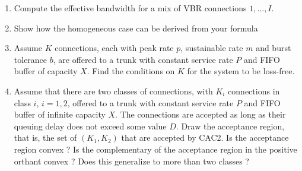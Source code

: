\begin{problem}
\begin{enumerate}
    \item Compute the effective bandwidth for a mix of VBR
    connections $1, \ldots, I$.

    \item Show how the homogeneous case can be derived from your formula

    \item Assume $K$ connections, each with peak rate $p$, sustainable rate
    $m$ and burst tolerance $b$, are offered to a trunk with constant
    service rate $P$ and FIFO buffer of capacity $X$. Find the
    conditions on $K$ for the system to be loss-free.

    \item  Assume that there are two classes of connections, with
    $K_{i}$ connections in class $i$, $i=1,2$, offered to a trunk with constant
    service rate $P$ and FIFO buffer of infinite capacity $X$. The
    connections are accepted as long as their queuing delay does
    not exceed some value $D$.
    Draw the acceptance region, that is, the set of $(K_{1}, K_{2})$
    that are accepted by CAC2. Is the
    acceptance region convex ? Is the complementary of the
    acceptance region in the positive orthant convex ? Does this
    generalize to more than two classes ?
\end{enumerate}
\end{problem}
